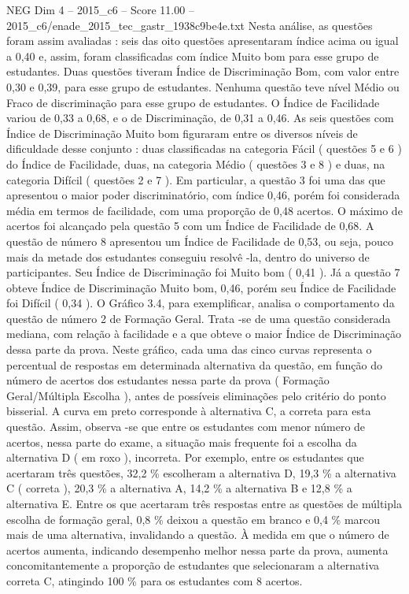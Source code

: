 \begin{textsample}{NEG Dim 4 – 2015\_c6 – Score 11.00 – 2015\_c6/enade\_2015\_tec\_gastr\_1938c9be4e.txt}
Nesta análise, as questões foram assim avaliadas : seis das oito questões apresentaram índice acima ou igual a 0,40 e, assim, foram classificadas com índice Muito bom para esse grupo de estudantes.
Duas questões tiveram Índice de Discriminação Bom, com valor entre 0,30 e 0,39, para esse grupo de estudantes.
Nenhuma questão teve nível Médio ou Fraco de discriminação para esse grupo de estudantes.
O Índice de Facilidade variou de 0,33 a 0,68, e o de Discriminação, de 0,31 a 0,46.
As seis questões com Índice de Discriminação Muito bom figuraram entre os diversos níveis de dificuldade desse conjunto : duas classificadas na categoria Fácil ( questões 5 e 6 ) do Índice de Facilidade, duas, na categoria Médio ( questões 3 e 8 ) e duas, na categoria Difícil ( questões 2 e 7 ).
Em particular, a questão 3 foi uma das que apresentou o maior poder discriminatório, com índice 0,46, porém foi considerada média em termos de facilidade, com uma proporção de 0,48 acertos.
O máximo de acertos foi alcançado pela questão 5 com um Índice de Facilidade de 0,68.
A questão de número 8 apresentou um Índice de Facilidade de 0,53, ou seja, pouco mais da metade dos estudantes conseguiu resolvê -la, dentro do universo de participantes.
Seu Índice de Discriminação foi Muito bom ( 0,41 ).
Já a questão 7 obteve Índice de Discriminação Muito bom, 0,46, porém seu Índice de Facilidade foi Difícil ( 0,34 ).
O Gráfico 3.4, para exemplificar, analisa o comportamento da questão de número 2 de Formação Geral.
Trata -se de uma questão considerada mediana, com relação à facilidade e a que obteve o maior Índice de Discriminação dessa parte da prova.
Neste gráfico, cada uma das cinco curvas representa o percentual de respostas em determinada alternativa da questão, em função do número de acertos dos estudantes nessa parte da prova ( Formação Geral/Múltipla Escolha ), antes de possíveis eliminações pelo critério do ponto bisserial.
A curva em preto corresponde à alternativa C, a correta para esta questão.
Assim, observa -se que entre os estudantes com menor número de acertos, nessa parte do exame, a situação mais frequente foi a escolha da alternativa D ( em roxo ), incorreta.
Por exemplo, entre os estudantes que acertaram três questões, 32,2 \% escolheram a alternativa D, 19,3 \% a alternativa C ( correta ), 20,3 \% a alternativa A, 14,2 \% a alternativa B e 12,8 \% a alternativa E.
Entre os que acertaram três respostas entre as questões de múltipla escolha de formação geral, 0,8 \% deixou a questão em branco e 0,4 \% marcou mais de uma alternativa, invalidando a questão.
À medida em que o número de acertos aumenta, indicando desempenho melhor nessa parte da prova, aumenta concomitantemente a proporção de estudantes que selecionaram a alternativa correta C, atingindo 100 \% para os estudantes com 8 acertos.

\end{textsample}
